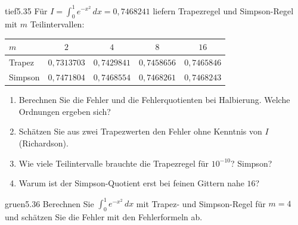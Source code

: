 \begin{karte}{tief}{5.35}{\typtypisch}{}
Für $I = \int_0^1e^{-x^{2}}\,dx = 0{,}7468241$ liefern Trapezregel und Simpson-Regel mit $m$ Teilintervallen:
\begin{center}\small
\begin{tabular}{lcccc}
$m$ & $2$ & $4$ & $8$ & $16$\\ \hline
Trapez & $0{,}7313703$ & $0{,}7429841$ & $0{,}7458656$ & $0{,}7465846$\\
Simpson & $0{,}7471804$ & $0{,}7468554$ & $0{,}7468261$ & $0{,}7468243$
\end{tabular}
\end{center}
\begin{enumerate}[label=(\alph*),leftmargin=1.6em,itemsep=2pt]
\item Berechnen Sie die Fehler und die Fehlerquotienten bei Halbierung. Welche Ordnungen ergeben sich?
\item Schätzen Sie aus zwei Trapezwerten den Fehler ohne Kenntnis von $I$ (Richardson).
\item Wie viele Teilintervalle brauchte die Trapezregel für $10^{-10}$? Simpson?
\item Warum ist der Simpson-Quotient erst bei feinen Gittern nahe $16$?
\end{enumerate}
\end{karte}

\begin{karte}{gruen}{5.36}{\typwerk}{}
Berechnen Sie $\int_0^1e^{-x^{2}}\,dx$ mit Trapez- und Simpson-Regel für $m = 4$ und schätzen Sie die Fehler mit den Fehlerformeln ab.
\end{karte}

